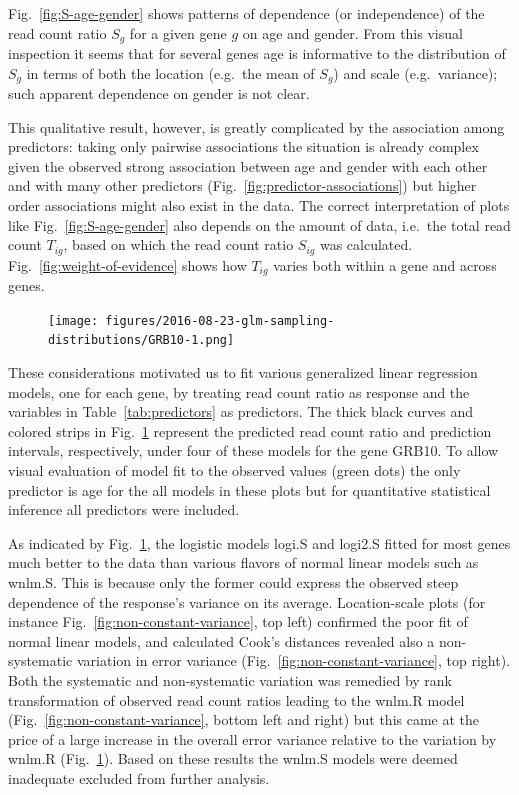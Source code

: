 \documentclass[letterpaper]{article}
\begin{document}
Fig.~\ref{fig:S-age-gender} shows patterns of dependence (or independence) of
the read count ratio \(S_g\) for a given gene \(g\) on age and gender.  From
this visual inspection it seems that for several genes age is informative to
the distribution of \(S_g\) in terms of both the location (e.g.~the mean of
\(S_g\)) and scale (e.g.~variance); such apparent dependence on gender is not
clear.

This qualitative result, however, is greatly complicated by the association
among predictors: taking only pairwise associations the situation is already
complex given the observed strong association between age and gender with each
other and with many other predictors (Fig.~\ref{fig:predictor-associations})
but higher order associations might also exist in the data.
The correct interpretation of plots like Fig.~\ref{fig:S-age-gender} also depends on
the amount of data, i.e.~the total read count \(T_{ig}\), based on which the
read count ratio \(S_{ig}\) was calculated.  Fig.~\ref{fig:weight-of-evidence}
shows how \(T_{ig}\) varies both within a gene and across genes.

\begin{figure}
\begin{center}
\texttt{[image: figures/2016-08-23-glm-sampling-distributions/GRB10-1.png]}
\end{center}
\caption{}
\label{fig:predicted-curves}
\end{figure}

These considerations motivated us to fit various generalized linear regression
models, one for each gene, by treating read count ratio as response and the
variables in Table~\ref{tab:predictors} as predictors. The thick black curves
and colored strips in Fig.~\ref{fig:predicted-curves} represent the predicted
read count ratio and prediction intervals, respectively, under four of these
models for the gene GRB10.  To allow visual evaluation of model fit to the
observed values (green dots) the only predictor is age for the all models in
these plots but for quantitative statistical inference all predictors were
included.

As indicated by Fig.~\ref{fig:predicted-curves}, the logistic models logi.S
and logi2.S fitted for most genes much better to the data than various flavors
of normal linear models such as wnlm.S.  This is because only the former could
express the observed steep dependence of the response's variance on its
average. Location-scale plots (for instance
Fig.~\ref{fig:non-constant-variance}, top left) confirmed the poor fit of
normal linear models, and calculated Cook's distances revealed also a
non-systematic variation in error variance
(Fig.~\ref{fig:non-constant-variance}, top right).  Both the systematic and
non-systematic variation was remedied by rank transformation of observed read
count ratios leading to the wnlm.R model
(Fig.~\ref{fig:non-constant-variance}, bottom left and right) but this came at
the price of a large increase in the overall error variance relative to the
variation by wnlm.R (Fig.~\ref{fig:predicted-curves}).  Based on these results
the wnlm.S models were deemed inadequate excluded from further
analysis.
\end{document}
